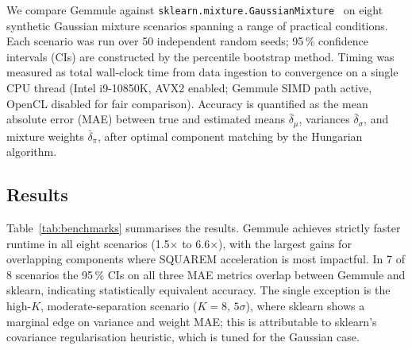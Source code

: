 ﻿\documentclass[10pt,twocolumn]{article}
\begin{document}
We compare Gemmule against
\texttt{sklearn.mixture.GaussianMixture}~\citep{pedregosa2011scikit}
on eight synthetic Gaussian mixture scenarios spanning a range of practical
conditions.
Each scenario was run over 50 independent random seeds; 95\,\% confidence
intervals (CIs) are constructed by the percentile bootstrap method.
Timing was measured as total wall-clock time from data ingestion to
convergence on a single CPU thread (Intel i9-10850K, AVX2 enabled;
Gemmule SIMD path active, OpenCL disabled for fair comparison).
Accuracy is quantified as the mean absolute error (MAE) between
true and estimated means $\bar{\delta}_\mu$, variances $\bar{\delta}_\sigma$,
and mixture weights $\bar{\delta}_\pi$, after optimal component matching
by the Hungarian algorithm.

\subsection{Results}

Table~\ref{tab:benchmarks} summarises the results.
Gemmule achieves strictly faster runtime in all eight scenarios (1.5$\times$
to 6.6$\times$), with the largest gains for overlapping components where
SQUAREM acceleration is most impactful.
In 7 of 8 scenarios the 95\,\% CIs on all three MAE metrics overlap between
Gemmule and sklearn, indicating statistically equivalent accuracy.
The single exception is the high-$K$, moderate-separation scenario
($K = 8$, $5\sigma$), where sklearn shows a marginal edge on variance
and weight MAE; this is attributable to sklearn's covariance regularisation
heuristic, which is tuned for the Gaussian case.
\end{document}
